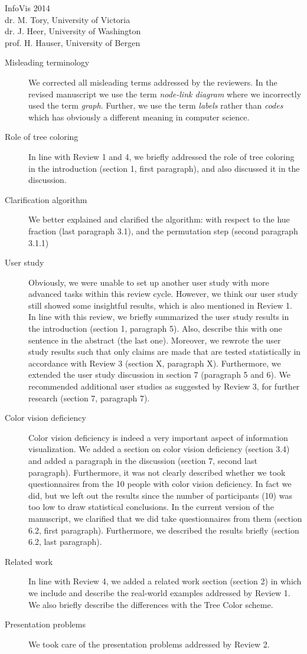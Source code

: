 \documentclass{letter}
\begin{document}
\begin{letter}{InfoVis 2014 \\ dr. M. Tory, University of Victoria \\ dr. J. Heer, University of Washington \\ prof. H. Hauser, University of Bergen}
\begin{description}
\item[Misleading terminology] We corrected all misleading terms addressed by the reviewers. In the revised manuscript we use the term \textit{node-link diagram} where we incorrectly used the term \textit{graph}. Further, we use the term \textit{labels} rather than \textit{codes} which has obviously a different meaning in computer science.
\item[Role of tree coloring] In line with Review 1 and 4, we briefly addressed the role of tree coloring in the introduction (section 1, first paragraph), and also discussed it in the discussion.
\item[Clarification algorithm] We better explained and clarified the algorithm: with respect to the hue fraction (last paragraph 3.1), and the permutation step (second paragraph 3.1.1)
\item[User study] Obviously, we were unable to set up another user study with more advanced tasks within this review cycle. However, we think our user study still showed some insightful results, which is also mentioned in Review 1.  In line with this review, we briefly summarized the user study results in the introduction (section 1, paragraph 5). Also, describe this with one sentence in the abstract (the last one). Moreover, we rewrote the user study results such that only claims are made that are tested statistically in accordance with Review 3 (section X, paragraph X). Furthermore, we extended the user study discussion in section 7 (paragraph 5 and 6). We recommended additional user studies as suggested by Review 3, for further research (section 7, paragraph 7).
\item[Color vision deficiency] Color vision deficiency is indeed a very important aspect of information visualization. We added a section on color vision deficiency (section 3.4) and added a paragraph in the discussion (section 7, second last paragraph). Furthermore, it was not clearly described whether we took questionnaires from the 10 people with color vision deficiency. In fact we did, but we left out the results since the number of participants (10) was too low to draw statistical conclusions. In the current version of the manuscript, we clarified that we did take questionnaires from them (section 6.2, first paragraph). Furthermore, we described the results briefly (section 6.2, last paragraph).
\item[Related work] In line with Review 4, we added a related work section (section 2) in which we include and describe the real-world examples addressed by Review 1. We also briefly describe the differences with the Tree Color scheme.
\item[Presentation problems] We took care of the presentation problems addressed by Review 2.
\end{description}


\end{letter}
\end{document}
